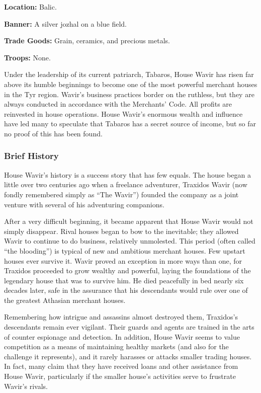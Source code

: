 \textbf{Location:} Balic.

\textbf{Banner:} A silver jozhal on a blue field.

\textbf{Trade Goods:} Grain, ceramics, and precious metals.

\textbf{Troops:} None.

Under the leadership of its current patriarch, Tabaros, House Wavir has risen far above its humble beginnings to become one of the most powerful merchant houses in the Tyr region. Wavir's business practices border on the ruthless, but they are always conducted in accordance with the Merchants' Code. All profits are reinvested in house operations. House Wavir's enormous wealth and influence have led many to speculate that Tabaros has a secret source of income, but so far no proof of this has been found.

\subsubsection{Brief History}
House Wavir's history is a success story that has few equals. The house began a little over two centuries ago when a freelance adventurer, Traxidos Wavir (now fondly remembered simply as ``The Wavir'') founded the company as a joint venture with several of his adventuring companions.

After a very difficult beginning, it became apparent that House Wavir would not simply disappear. Rival houses began to bow to the inevitable; they allowed Wavir to continue to do business, relatively unmolested. This period (often called ``the blooding'') is typical of new and ambitious merchant houses. Few upstart houses ever survive it. Wavir proved an exception in more ways than one, for Traxidos proceeded to grow wealthy and powerful, laying the foundations of the legendary house that was to survive him. He died peacefully in bed nearly six decades later, safe in the assurance that his descendants would rule over one of the greatest Athasian merchant houses.

Remembering how intrigue and assassins almost destroyed them, Traxidos's descendants remain ever vigilant. Their guards and agents are trained in the arts of counter espionage and detection. In addition, House Wavir seems to value competition as a means of maintaining healthy markets (and also for the challenge it represents), and it rarely harasses or attacks smaller trading houses. In fact, many claim that they have received loans and other assistance from House Wavir, particularly if the smaller house's activities serve to frustrate Wavir's rivals.


